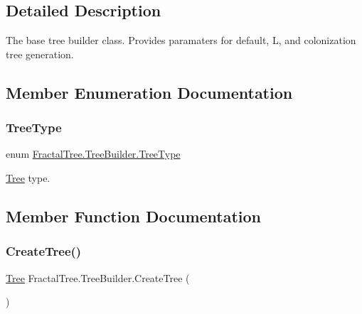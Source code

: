 \subsection{Detailed Description}
The base tree builder class. Provides paramaters for default, L, and colonization tree generation. 



\subsection{Member Enumeration Documentation}
\mbox{\label{class_fractal_tree_1_1_tree_builder_a955d67cfa976440cc427e591be74f979}} 
\subsubsection{\texorpdfstring{Tree\+Type}{TreeType}}
{\footnotesize\ttfamily enum \hyperlink{class_fractal_tree_1_1_tree_builder_a955d67cfa976440cc427e591be74f979}{Fractal\+Tree.\+Tree\+Builder.\+Tree\+Type}\hspace{0.3cm}{\ttfamily [strong]}}



\hyperlink{interface_fractal_tree_1_1_tree}{Tree} type. 



\subsection{Member Function Documentation}
\mbox{\label{class_fractal_tree_1_1_tree_builder_a8bea11ef52d57a75292efd34e6f40779}} 
\subsubsection{\texorpdfstring{Create\+Tree()}{CreateTree()}}
{\footnotesize\ttfamily \hyperlink{interface_fractal_tree_1_1_tree}{Tree} Fractal\+Tree.\+Tree\+Builder.\+Create\+Tree (\begin{DoxyParamCaption}{ }\end{DoxyParamCaption})\hspace{0.3cm}{\ttfamily [protected]}}



